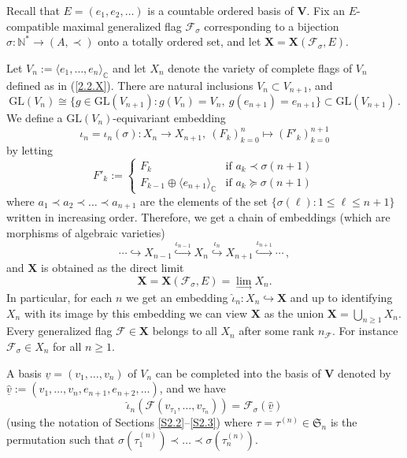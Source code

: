 \documentclass{amsart}
\theoremstyle{definition}
\newcommand{\NN}{\mathbb{N}^*}
\begin{document}
Recall that $E=(e_1,e_2,\ldots)$ is a countable ordered basis of $\mathbf{V}$.
Fix  an $E$-compatible maximal generalized flag $\mathcal{F}_\sigma$ corresponding
to a bijection $\sigma:\NN\to(A,\prec)$ onto a totally ordered set, and let
$\mathbf{X}=\mathbf{X}(\mathcal{F}_\sigma,E)$.

Let $V_n:=\langle e_1,\ldots,e_n\rangle_\mathbb{C}$ and
let $X_n$ denote the variety of complete flags of $V_n$ defined as in (\ref{2.2.X}).
There are natural inclusions
$V_n\subset V_{n+1}$,
and
\begin{equation}
\label{4.4-1}
\mathrm{GL}(V_n)\cong\{g\in \mathrm{GL}(V_{n+1}):g(V_n)=V_n,\ g(e_{n+1})=e_{n+1}\}\subset \mathrm{GL}(V_{n+1})\,.
\end{equation}
We define a $\mathrm{GL}(V_n)$-equivariant embedding
\[\iota_n=\iota_n(\sigma):X_n\to X_{n+1},\ (F_k)_{k=0}^n\mapsto (F'_k)_{k=0}^{n+1}\]
by letting
\[F'_k:=\left\{
\begin{array}{ll}
F_k & \mbox{if $a_k\prec\sigma(n+1)$} \\
F_{k-1}\oplus\langle e_{n+1}\rangle_\mathbb{C} & \mbox{if $a_k\succeq \sigma(n+1)$}
\end{array}
\right.\]
where $a_1\prec a_2\prec\ldots\prec a_{n+1}$ are the elements of the set $\{\sigma(\ell):1\leq \ell\leq n+1\}$ written in increasing order.
Therefore, we get a chain of embeddings (which are morphisms of algebraic varieties)
\[\cdots \hookrightarrow X_{n-1} \stackrel{\iota_{n-1}}{\hookrightarrow} X_n \stackrel{\iota_{n}}{\hookrightarrow} X_{n+1} \stackrel{\iota_{n+1}}{\hookrightarrow} \cdots\,,\]
and $\mathbf{X}$ is obtained as the direct limit 
\[\mathbf{X}=\mathbf{X}(\mathcal{F}_\sigma,E)=\lim_\to X_n.\]
In particular, for each $n$ we get an embedding $\hat{\iota}_n:X_n\hookrightarrow \mathbf{X}$ 
and up to identifying $X_n$ with its image by this embedding we can view $\mathbf{X}$ as the union
$\mathbf{X}=\bigcup_{n\geq 1}X_n$.
Every generalized flag $\mathcal{F}\in\mathbf{X}$ belongs to all $X_n$ after some rank $n_\mathcal{F}$. For instance $\mathcal{F}_\sigma\in X_n$ for all $n\geq 1$.

A basis $\underline{v}=(v_1,\ldots,v_n)$ of $V_n$ can be completed into the basis of $\mathbf{V}$ denoted by $\underline{\hat{v}}:=(v_1,\ldots,v_n,e_{n+1},e_{n+2},\ldots)$, and we have
\begin{equation}
\label{completed-basis}
\hat{\iota}_n(\mathcal{F}(v_{\tau_1},\ldots,v_{\tau_n}))=\mathcal{F}_\sigma(\underline{\hat{v}})
\end{equation}
(using the notation of Sections \ref{S2.2}--\ref{S2.3})
where $\tau=\tau^{(n)}\in\mathfrak{S}_n$ is the permutation such that
$\sigma(\tau^{(n)}_1)\prec\ldots\prec\sigma(\tau^{(n)}_n)$.
\end{document}
